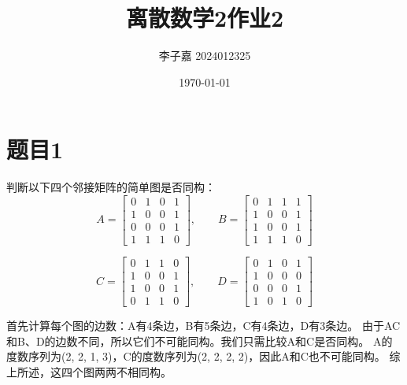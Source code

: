 \documentclass[utf8]{ctexart}
\title{\textbf{离散数学2\quad 作业2}}
\date{\today}
\author{李子嘉 2024012325}
\theoremstyle{mystyle}
\begin{document}
\maketitle

\section*{题目1}

\begin{problembox}
判断以下四个邻接矩阵的简单图是否同构：
\[
A=
\begin{bmatrix}
0 & 1 & 0 & 1\\
1 & 0 & 0 & 1\\
0 & 0 & 0 & 1\\
1 & 1 & 1 & 0
\end{bmatrix},\qquad
B=
\begin{bmatrix}
0 & 1 & 1 & 1\\
1 & 0 & 0 & 1\\
1 & 0 & 0 & 1\\
1 & 1 & 1 & 0
\end{bmatrix}
\]

\[
C=
\begin{bmatrix}
0 & 1 & 1 & 0\\
1 & 0 & 0 & 1\\
1 & 0 & 0 & 1\\
0 & 1 & 1 & 0
\end{bmatrix},\qquad
D=
\begin{bmatrix}
0 & 1 & 0 & 1\\
1 & 0 & 0 & 0\\
0 & 0 & 0 & 1\\
1 & 0 & 1 & 0
\end{bmatrix}
\]
\end{problembox}

首先计算每个图的边数：A有4条边，B有5条边，C有4条边，D有3条边。
由于AC和B、D的边数不同，所以它们不可能同构。我们只需比较A和C是否同构。
A的度数序列为(2, 2, 1, 3)，C的度数序列为(2, 2, 2, 2)，因此A和C也不可能同构。
综上所述，这四个图两两不相同构。
\end{document}
